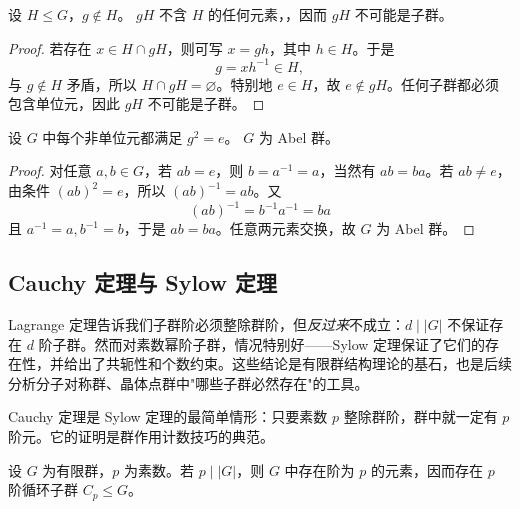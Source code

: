 \par
\begin{proposition}[陪集不是子群]
设 $H\leqslant G$，$g\notin H$。 $gH$ 不含 $H$ 的任何元素，，因而 $gH$ 不可能是子群。
\end{proposition}

\begin{proof}
若存在 $x\in H\cap gH$，则可写 $x=gh$，其中 $h\in H$。于是
\[
g=xh^{-1}\in H,
\]
与 $g\notin H$ 矛盾，所以 $H\cap gH=\varnothing$。特别地 $e\in H$，故 $e\notin gH$。任何子群都必须包含单位元，因此 $gH$ 不可能是子群。
\end{proof}
\par

\par
\begin{proposition}[全为二阶元的群]
设 $G$ 中每个非单位元都满足 $g^2=e$。 $G$ 为 Abel 群。
\end{proposition}

\begin{proof}
对任意 $a,b\in G$，若 $ab=e$，则 $b=a^{-1}=a$，当然有 $ab=ba$。若 $ab\neq e$，由条件 $(ab)^2=e$，所以 $(ab)^{-1}=ab$。又
\[
(ab)^{-1}=b^{-1}a^{-1}=ba
\]
且 $a^{-1}=a,b^{-1}=b$，于是 $ab=ba$。任意两元素交换，故 $G$ 为 Abel 群。
\end{proof}
\par
\subsection{Cauchy 定理与 Sylow 定理}
\label{sec:cauchy-sylow}

Lagrange 定理告诉我们子群阶必须整除群阶，但\emph{反过来}不成立：$d\mid\lvert G\rvert$ 不保证存在 $d$ 阶子群。然而对素数幂阶子群，情况特别好——Sylow 定理保证了它们的存在性，并给出了共轭性和个数约束。这些结论是有限群结构理论的基石，也是后续分析分子对称群、晶体点群中"哪些子群必然存在"的工具。

Cauchy 定理是 Sylow 定理的最简单情形：只要素数 $p$ 整除群阶，群中就一定有 $p$ 阶元。它的证明是群作用计数技巧的典范。

\begin{theorem}[Cauchy 定理]
设 $G$ 为有限群，$p$ 为素数。若 $p\mid\lvert G\rvert$，则 $G$ 中存在阶为 $p$ 的元素，因而存在 $p$ 阶循环子群 $C_p\leqslant G$。
\label{thm:cauchy}
\end{theorem}

